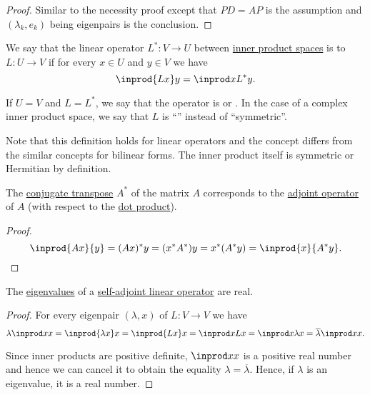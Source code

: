 \begin{proof}
  \SufficiencySubProof Similar to the necessity proof except that \( P D = A P \) is the assumption and \( (\lambda_k, e_k) \) being eigenpairs is the conclusion.
\end{proof}

\begin{definition}\label{def:adjoint_operator}\mimprovised
  We say that the linear operator \( L^*: V \to U \) between \hyperref[def:inner_product_space]{inner product spaces} is  to \( L: U \to V \) if for every \( x \in U \) and \( y \in V \) we have
  \begin{equation*}
    \inprod {Lx} y = \inprod x {L^* y}.
  \end{equation*}

  If \( U = V \) and \( L = L^* \), we say that the operator is  or . In the case of a complex inner product space, we say that \( L \) is \enquote{} instead of \enquote{symmetric}.

  Note that this definition holds for linear operators and the concept differs from the similar concepts for bilinear forms. The inner product itself is symmetric or Hermitian by definition.
\end{definition}

\begin{proposition}\label{thm:conjugate_transpose}
  The \hyperref[def:conjugate_transpose]{conjugate transpose} \( A^* \) of the matrix \( A \) corresponds to the \hyperref[def:adjoint_operator]{adjoint operator} of \( A \) (with respect to the \hyperref[def:inner_product_space]{dot product}).
\end{proposition}
\begin{proof}
  \begin{equation*}
    \inprod {Ax} {y}
    =
    (Ax)^* y
    =
    (x^* A^*) y
    =
    x^* (A^* y)
    =
    \inprod {x} {A^* y}.
  \end{equation*}
\end{proof}

\begin{lemma}\label{thm:hermitian_operator_eigenvalues_are_real}
  The \hyperref[def:eigenpair]{eigenvalues} of a \hyperref[def:adjoint_operator]{self-adjoint linear operator} are real.
\end{lemma}
\begin{proof}
  For every eigenpair \( (\lambda, x) \) of \( L: V \to V \) we have
  \begin{equation*}
    \lambda \inprod x x
    =
    \inprod {\lambda x} x
    =
    \inprod {L x} x
    =
    \inprod x {L x}
    =
    \inprod x {\lambda x}
    =
    \overline \lambda \inprod x x.
  \end{equation*}

  Since inner products are positive definite, \( \inprod x x \) is a positive real number and hence we can cancel it to obtain the equality \( \lambda = \overline \lambda \). Hence, if \( \lambda \) is an eigenvalue, it is a real number.
\end{proof}

